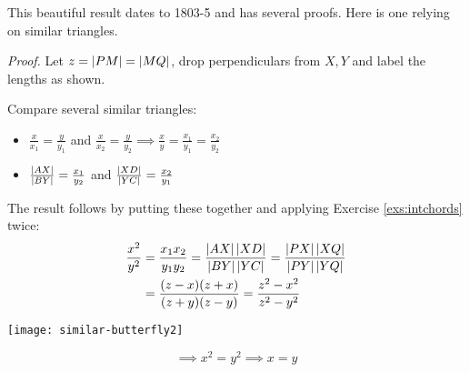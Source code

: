 This beautiful result dates to 1803-5 and has several proofs. Here is one relying on similar triangles.


\begin{tcolorbox}[proofstyle]
\begin{minipage}[t]{0.6\linewidth}\vspace{0pt}
\emph{Proof.}\lstsp
Let $z=\left| PM\right|=\left| MQ\right|$, drop perpendiculars from $X,Y$ and label the lengths as shown.\par
Compare several similar triangles:
\begin{itemize}
  \item $\frac{x}{x_1}=\frac{y}{y_1}$ and $\frac{x}{x_2}=\frac{y}{y_2} \implies \frac xy=\frac{x_1}{y_1}=\frac{x_2}{y_2}$
  \item $\frac{\left| AX\right|}{\left| BY\right|}=\frac{x_1}{y_2}$ and $\frac{\left| XD\right|}{\left| YC\right|}=\frac{x_2}{y_1}$
\end{itemize}
The result follows by putting these together and applying Exercise \ref{exs:intchords} twice:\footnotemark
\begin{align*}
\frac{x^2}{y^2}&=\frac{x_1x_2}{y_1y_2}=\frac{\left| AX\right|\left| XD\right|}{\left| BY\right|\left| YC\right|} =\frac{\left| PX\right|\left| XQ\right|}{\left| PY\right|\left| YQ\right|}\\
&=\frac{(z-x)(z+x)}{(z+y)(z-y)} =\frac{z^2-x^2}{z^2-y^2}
\end{align*}
\end{minipage}\hfill\begin{minipage}[t]{0.39\linewidth}\vspace{0pt}
\flushright\texttt{[image: similar-butterfly2]}
\end{minipage}\par\vspace{-5pt}
\[\implies x^2=y^2\implies x=y\tag*{\qedsymbol}\]
\end{tcolorbox}



